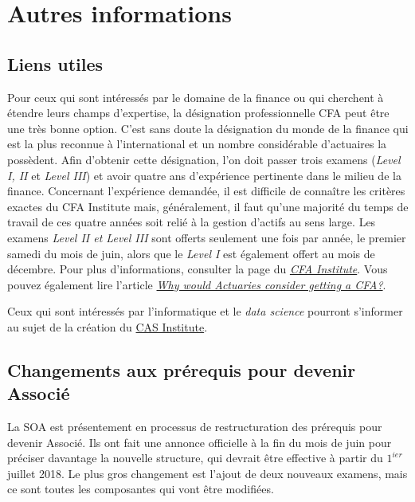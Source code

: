 \section*{Autres informations}
\label{sec:autres}

\subsection*{Liens utiles}
\label{subsec:liens}
Pour ceux qui sont intéressés par le domaine de la finance ou qui cherchent à étendre leurs champs d'expertise, la désignation professionnelle CFA peut être une très bonne option. C'est sans doute la désignation du monde de la finance qui est la plus reconnue à l'international et un nombre considérable d'actuaires la possèdent. Afin d'obtenir cette désignation, l'on doit passer trois examens (\emph{Level I, II} et \emph{Level III}) et avoir quatre ans d'expérience pertinente dans le milieu de la finance. Concernant l'expérience demandée, il est difficile de connaître les critères exactes du CFA Institute mais, généralement, il faut qu'une majorité du temps de travail de ces quatre années soit relié à la gestion d'actifs au sens large. Les examens \emph{Level II \emph{et} Level III} sont offerts seulement une fois par année, le premier samedi du mois de juin, alors que le \emph{Level I} est également offert au mois de décembre. Pour plus d'informations, consulter la page du \href{https://www.cfainstitute.org/Pages/index.aspx}{\emph{CFA Institute}}. Vous pouvez également lire l'article \href{http://blog.coachingactuaries.com/why-would-actuaries-consider-getting-a-cfa/}{\emph{Why would Actuaries consider getting a CFA?}}.\vspace{\baselineskip}

Ceux qui sont intéressés par l'informatique et le \emph{data science} pourront s'informer au sujet de la création du \href{http://www.casact.org/press/index.cfm?fa=viewArticle&articleID=3083}{CAS Institute}.\vspace{\baselineskip} 

\newpage
\subsection*{Changements aux prérequis pour devenir Associé}
\label{subsec:changeasa}
La SOA est présentement en processus de restructuration des prérequis pour devenir Associé. Ils ont fait une annonce officielle à la fin du mois de juin pour préciser davantage la nouvelle structure, qui devrait être effective à partir du $1^{ier}$ juillet 2018. Le plus gros changement est l’ajout de deux nouveaux examens, mais ce sont toutes les composantes qui vont être modifiées.\vspace{\baselineskip} 

